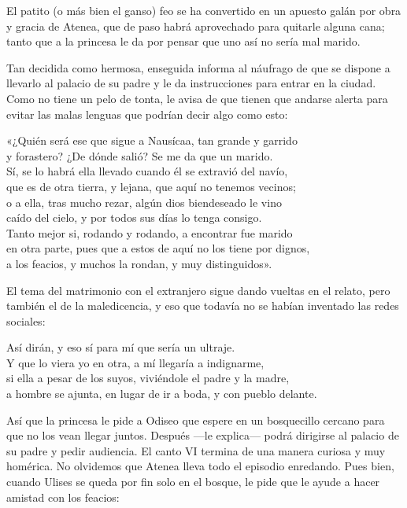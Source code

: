 El patito (o más bien el ganso) feo se ha convertido en un apuesto galán por obra y gracia de Atenea, que de paso habrá aprovechado para quitarle alguna cana; tanto que a la princesa le da por pensar que uno así no sería mal marido.

Tan decidida como hermosa, enseguida informa al náufrago de que se dispone a llevarlo al palacio de su padre y le da instrucciones para entrar en la ciudad. Como no tiene un pelo de tonta, le avisa de que tienen que andarse alerta para evitar las malas lenguas que podrían decir algo como esto:

\begin{versocita}
«¿Quién será ese que sigue a Nausícaa, tan grande y garrido\\
y forastero? ¿De dónde salió? Se me da que un marido.\\
Sí, se lo habrá ella llevado cuando él se extravió del navío,\\
que es de otra tierra, y lejana, que aquí no tenemos vecinos;\\
o a ella, tras mucho rezar, algún dios biendeseado le vino\\
caído del cielo, y por todos sus días lo tenga consigo.\\
Tanto mejor si, rodando y rodando, a encontrar fue marido\\
en otra parte, pues que a estos de aquí no los tiene por dignos,\\
a los feacios, y muchos la rondan, y muy distinguidos».
\end{versocita}


El tema del matrimonio con el extranjero sigue dando vueltas en el relato, pero también el de la maledicencia, y eso que todavía no se habían inventado las redes sociales:

\begin{versocita}
Así dirán, y eso sí para mí que sería un ultraje.\\
Y que lo viera yo en otra, a mí llegaría a indignarme,\\
si ella a pesar de los suyos, viviéndole el padre y la madre,\\
a hombre se ajunta, en lugar de ir a boda, y con pueblo delante.
\end{versocita}

Así que la princesa le pide a Odiseo que espere en un bosquecillo cercano para que no los vean llegar juntos. Después ---le explica--- podrá dirigirse al palacio de su padre y pedir audiencia. El canto VI termina de una manera curiosa y muy homérica. No olvidemos que Atenea lleva todo el episodio enredando. Pues bien, cuando Ulises se queda por fin solo en el bosque, le pide que le ayude a hacer amistad con los feacios:

